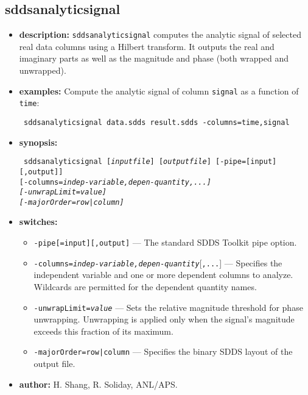\newpage
\subsection{sddsanalyticsignal}
\label{sddsanalyticsignal}

\begin{itemize}
\item {\bf description:}
  {\tt sddsanalyticsignal} computes the analytic signal of selected real data columns
  using a Hilbert transform.  It outputs the real and imaginary parts as well as
  the magnitude and phase (both wrapped and unwrapped).
\item {\bf examples:}
  Compute the analytic signal of column {\tt signal} as a function of {\tt time}:
  \begin{flushleft}{\tt
  sddsanalyticsignal data.sdds result.sdds -columns=time,signal
  }\end{flushleft}
\item {\bf synopsis:}
  \begin{flushleft}{\tt
  sddsanalyticsignal [{\em inputfile}] [{\em outputfile}] [-pipe=[input][,output]] \\
    {}[-columns=\em indep-variable,\em depen-quantity\lbrack,...\rbrack] \\
    {}[-unwrapLimit=\em value] \\
    {}[-majorOrder=row|column]
  }\end{flushleft}
\item {\bf switches:}
    \begin{itemize}
    \item \verb|-pipe[=input][,output]| --- The standard SDDS Toolkit pipe option.
    \item {\tt -columns=\em indep-variable,\em depen-quantity}[{\tt ,...}] ---
    Specifies the independent variable and one or more dependent columns to
    analyze.  Wildcards are permitted for the dependent quantity names.
    \item {\tt -unwrapLimit=\em value} --- Sets the relative magnitude threshold
    for phase unwrapping.  Unwrapping is applied only when the signal's
    magnitude exceeds this fraction of its maximum.
    \item {\tt -majorOrder=row|column} --- Specifies the binary SDDS layout of
    the output file.
    \end{itemize}
\item {\bf author:} H. Shang, R. Soliday, ANL/APS.
\end{itemize}
